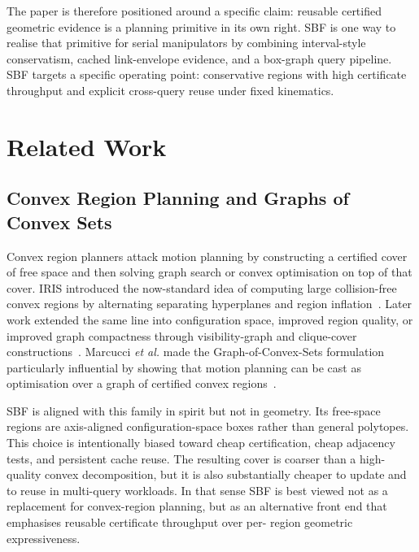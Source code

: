 \documentclass[journal]{IEEEtran}
\newcommand{\etal}{\textit{et al.}}
\begin{document}
The paper is therefore positioned around a specific claim: reusable certified
geometric evidence is a planning primitive in its own right. SBF is one way to
realise that primitive for serial manipulators by combining interval-style
conservatism, cached link-envelope evidence, and a box-graph query pipeline.
SBF targets a specific operating point: conservative regions with high
certificate throughput and explicit cross-query reuse under fixed kinematics.

\section{Related Work}\label{sec:related}

\subsection{Convex Region Planning and Graphs of Convex Sets}

Convex region planners attack motion planning by constructing a certified cover
of free space and then solving graph search or convex optimisation on top of
that cover. IRIS introduced the now-standard idea of computing large
collision-free convex regions by alternating separating hyperplanes and region
inflation~\cite{deits2015computing}. Later work extended the same line into
configuration space, improved region quality, or improved graph compactness
through visibility-graph and clique-cover constructions~\cite{amice2022finding,
petersen2023growing,werner2024approximating}. Marcucci \etal{} made the
Graph-of-Convex-Sets formulation particularly influential by showing that motion
planning can be cast as optimisation over a graph of certified convex
regions~\cite{marcucci2023motion,marcucci2024shortest}.

SBF is aligned with this family in spirit but not in geometry. Its free-space
regions are axis-aligned configuration-space boxes rather than general
polytopes. This choice is intentionally biased toward cheap certification,
cheap adjacency tests, and persistent cache reuse. The resulting cover is
coarser than a high-quality convex decomposition, but it is also substantially
cheaper to update and to reuse in multi-query workloads. In that sense SBF is
best viewed not as a replacement for convex-region planning, but as an
alternative front end that emphasises reusable certificate throughput over per-
region geometric expressiveness.
\end{document}
